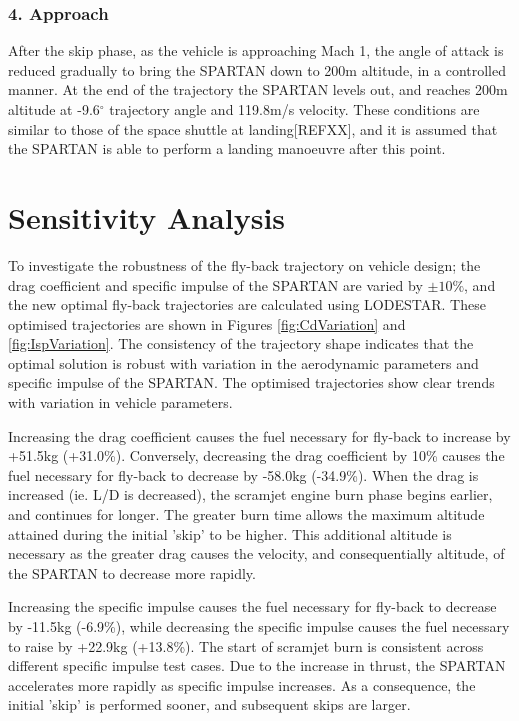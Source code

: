 \documentclass[journal]{new-aiaa} %
\begin{document}
\subsubsection{4. Approach}
After the skip phase, as the vehicle is approaching Mach 1, the angle of attack is reduced gradually to bring the SPARTAN down to 200m altitude, in a controlled manner. 
 At the end of the trajectory the SPARTAN levels out, and reaches 200m altitude at -9.6$^\circ$ trajectory angle and 119.8m/s velocity. These conditions are similar to those of the space shuttle at landing[REFXX], and it is assumed that the SPARTAN is able to perform a landing manoeuvre after this point. 



 




\section{Sensitivity Analysis}
To investigate the robustness of the fly-back trajectory on vehicle design; the drag coefficient and specific impulse of the SPARTAN are varied by $\pm 10\%$, and the new optimal fly-back trajectories are calculated using LODESTAR. These optimised trajectories are shown in Figures \ref{fig:CdVariation} and \ref{fig:IspVariation}.
The consistency of the trajectory shape indicates that the optimal solution is robust with variation in the aerodynamic parameters and specific impulse of the SPARTAN. The optimised trajectories show clear trends with variation in vehicle parameters.

 Increasing the drag coefficient causes the fuel necessary for fly-back to increase by +51.5kg (+31.0\%). Conversely, decreasing the drag coefficient by 10\% causes the fuel necessary for  fly-back to decrease by -58.0kg (-34.9\%). 
 When the drag is increased (ie. L/D is decreased), the scramjet engine burn phase begins earlier, and continues for longer. 
 The greater burn time allows the maximum altitude attained during the initial 'skip' to be higher. 
 This additional altitude is necessary as the greater drag causes the velocity, and consequentially altitude, of the SPARTAN to decrease more rapidly.


Increasing the specific impulse causes the fuel necessary for fly-back to decrease by -11.5kg (-6.9\%), while decreasing the specific impulse causes the fuel necessary to raise by +22.9kg (+13.8\%). The start of scramjet burn is consistent across different specific impulse test cases. Due to the increase in thrust, the SPARTAN accelerates more rapidly as specific impulse increases. As a consequence, the initial 'skip' is performed sooner, and subsequent skips are larger. 
\end{document}

